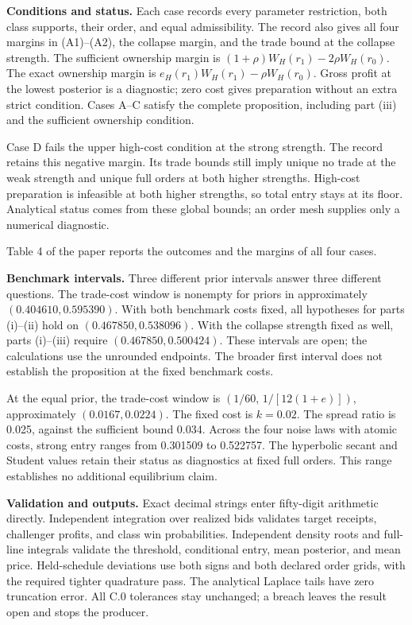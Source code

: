 \documentclass[
  11pt,
]{article}
\newcounter{none} %
\begin{document}
\textbf{Conditions and status.} Each case records every parameter
restriction, both class supports, their order, and equal admissibility.
The record also gives all four margins in (A1)--(A2), the collapse
margin, and the trade bound at the collapse strength. The sufficient
ownership margin is \((1+\rho)W_H(r_1)-2\rho W_H(r_0)\). The exact
ownership margin is \(e_H(r_1)W_H(r_1)-\rho W_H(r_0)\). Gross profit at
the lowest posterior is a diagnostic; zero cost gives preparation
without an extra strict condition. Cases A--C satisfy the complete
proposition, including part (iii) and the sufficient ownership
condition.

Case D fails the upper high-cost condition at the strong strength. The
record retains this negative margin. Its trade bounds still imply unique
no trade at the weak strength and unique full orders at both higher
strengths. High-cost preparation is infeasible at both higher strengths,
so total entry stays at its floor. Analytical status comes from these
global bounds; an order mesh supplies only a numerical diagnostic.

Table 4 of the paper reports the outcomes and the margins of all four
cases.

\textbf{Benchmark intervals.} Three different prior intervals answer
three different questions. The trade-cost window is nonempty for priors
in approximately \((0.404610,0.595390)\). With both benchmark costs
fixed, all hypotheses for parts (i)--(ii) hold on
\((0.467850,0.538096)\). With the collapse strength fixed as well, parts
(i)--(iii) require \((0.467850,0.500424)\). These intervals are open;
the calculations use the unrounded endpoints. The broader first interval
does not establish the proposition at the fixed benchmark costs.

At the equal prior, the trade-cost window is \((1/60,\,1/[12(1+e)])\),
approximately \((0.0167,0.0224)\). The fixed cost is \(k=0.02\). The
spread ratio is 0.025, against the sufficient bound 0.034. Across the
four noise laws with atomic costs, strong entry ranges from 0.301509 to
0.522757. The hyperbolic secant and Student values retain their status
as diagnostics at fixed full orders. This range establishes no
additional equilibrium claim.

\textbf{Validation and outputs.} Exact decimal strings enter fifty-digit
arithmetic directly. Independent integration over realized bids
validates target receipts, challenger profits, and class win
probabilities. Independent density roots and full-line integrals
validate the threshold, conditional entry, mean posterior, and mean
price. Held-schedule deviations use both signs and both declared order
grids, with the required tighter quadrature pass. The analytical Laplace
tails have zero truncation error. All C.0 tolerances stay unchanged; a
breach leaves the result open and stops the producer.
\end{document}
